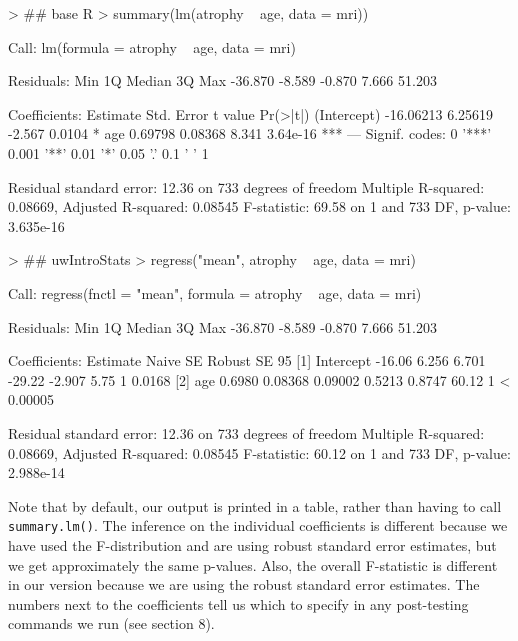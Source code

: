 \documentclass[landscape]{article}
\renewenvironment{Schunk}{\vspace{\topsep}}{\vspace{\topsep}}
\begin{document}
\begin{Schunk}
\begin{Sinput}
> ## base R
> summary(lm(atrophy ~ age, data = mri))
\end{Sinput}
\begin{Soutput}
Call:
lm(formula = atrophy ~ age, data = mri)

Residuals:
    Min      1Q  Median      3Q     Max 
-36.870  -8.589  -0.870   7.666  51.203 

Coefficients:
             Estimate Std. Error t value Pr(>|t|)    
(Intercept) -16.06213    6.25619  -2.567   0.0104 *  
age           0.69798    0.08368   8.341 3.64e-16 ***
---
Signif. codes:  0 '***' 0.001 '**' 0.01 '*' 0.05 '.' 0.1 ' ' 1

Residual standard error: 12.36 on 733 degrees of freedom
Multiple R-squared:  0.08669,	Adjusted R-squared:  0.08545 
F-statistic: 69.58 on 1 and 733 DF,  p-value: 3.635e-16
\end{Soutput}
\begin{Sinput}
> ## uwIntroStats
> regress("mean", atrophy ~ age, data = mri)
\end{Sinput}
\begin{Soutput}
Call:
regress(fnctl = "mean", formula = atrophy ~ age, data = mri)

Residuals:
    Min      1Q  Median      3Q     Max 
-36.870  -8.589  -0.870   7.666  51.203 

Coefficients:
                 Estimate  Naive SE  Robust SE    95%
[1] Intercept     -16.06     6.256     6.701       -29.22    -2.907           5.75 1    0.0168 
[2] age            0.6980   0.08368   0.09002       0.5213    0.8747         60.12 1  < 0.00005

Residual standard error: 12.36 on 733 degrees of freedom
Multiple R-squared:  0.08669,	Adjusted R-squared:  0.08545 
F-statistic: 60.12 on 1 and 733 DF,  p-value: 2.988e-14
\end{Soutput}
\end{Schunk}

Note that by default, our output is printed in a table, rather than having to call \texttt{summary.lm()}. The inference on the individual coefficients is different because we have used the F-distribution and are using robust standard error estimates, but we get approximately the same p-values. Also, the overall F-statistic is different in our version because we are using the robust standard error estimates. The numbers next to the coefficients tell us which to specify in any post-testing commands we run (see section 8).
\end{document}
